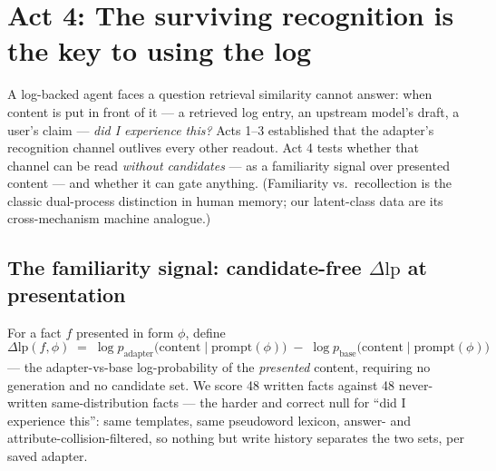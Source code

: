\documentclass[11pt]{article}
\newcommand{\dlp}{\Delta\mathrm{lp}}
\begin{document}
\section{Act 4: The surviving recognition is the key to using the log}\label{sec:act4}

A log-backed agent faces a question retrieval similarity cannot answer: when content is put in
front of it --- a retrieved log entry, an upstream model's draft, a user's claim --- \emph{did I
experience this?} Acts 1--3 established that the adapter's recognition channel outlives every
other readout. Act 4 tests whether that channel can be read \emph{without candidates} --- as a
familiarity signal over presented content --- and whether it can gate anything. (Familiarity
vs.\ recollection is the classic dual-process distinction in human memory; our latent-class data
are its cross-mechanism machine analogue.)

\subsection{The familiarity signal: candidate-free \texorpdfstring{$\dlp$}{dlp} at presentation}
\label{sec:famsignal}

For a fact $f$ presented in form $\phi$, define
\[
\dlp(f,\phi) \;=\; \log p_{\mathrm{adapter}}\bigl(\mathrm{content}\mid\mathrm{prompt}(\phi)\bigr)
\;-\; \log p_{\mathrm{base}}\bigl(\mathrm{content}\mid\mathrm{prompt}(\phi)\bigr)
\]
--- the adapter-vs-base log-probability of the \emph{presented} content, requiring no generation
and no candidate set.
We score 48 written facts against 48 never-written same-distribution facts --- the harder and
correct null for ``did I experience this'': same templates, same pseudoword lexicon, answer- and
attribute-collision-filtered, so nothing but write history separates the two sets,
per saved adapter.
\end{document}
